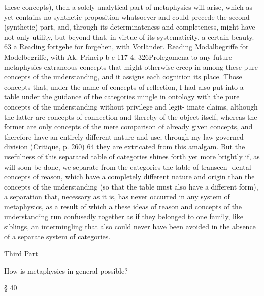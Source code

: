 these concepts), then a solely analytical part of metaphysics will arise, which
as yet contains no synthetic proposition whatsoever and could precede the
second (synthetic) part, and, through its determinateness and completeness,
might have not only utility, but beyond that, in virtue of its systematicity, a
certain beauty. 63
a Reading fortgehe for forgehen, with Vorländer.
Reading Modalbegriffe for Modelbegriffe, with Ak.
Princip
b
c
117
4: 326Prolegomena to any future metaphysics
extraneous concepts that might otherwise creep in among these pure
concepts of the understanding, and it assigns each cognition its place.
Those concepts that, under the name of concepts of reﬂection, I had also
put into a table under the guidance of the categories mingle in ontology
with the pure concepts of the understanding without privilege and legit-
imate claims, although the latter are concepts of connection and thereby
of the object itself, whereas the former are only concepts of the mere
comparison of already given concepts, and therefore have an entirely
different nature and use; through my law-governed division (Critique,
p. 260) 64 they are extricated from this amalgam. But the usefulness of
this separated table of categories shines forth yet more brightly if, as
will soon be done, we separate from the categories the table of transcen-
dental concepts of reason, which have a completely different nature and
origin than the concepts of the understanding (so that the table must
also have a different form), a separation that, necessary as it is, has never
occurred in any system of metaphysics, as a result of which a these ideas
of reason and concepts of the understanding run confusedly together as
if they belonged to one family, like siblings, an intermingling that also
could never have been avoided in the absence of a separate system of
categories.

Third Part

How is metaphysics in general possible?

§ 40

